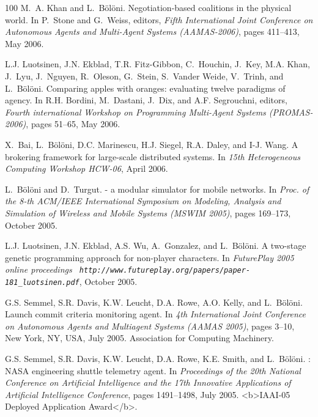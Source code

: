 \begin{thebibliography}{100}
M.~A. Khan and L.~Bölöni.
\newblock Negotiation-based coalitions in the physical world.
\newblock In P.~Stone and G.~Weiss, editors, {\em Fifth International Joint
  Conference on Autonomous Agents and Multi-Agent Systems (AAMAS-2006)}, pages
  411--413, May 2006.

L.J. Luotsinen, J.N. Ekblad, T.R. Fitz-Gibbon, C.~Houchin, J.~Key, M.A. Khan,
  J.~Lyu, J.~Nguyen, R.~Oleson, G.~Stein, S.~Vander Weide, V.~Trinh, and
  L.~Bölöni.
\newblock Comparing apples with oranges: evaluating twelve paradigms of agency.
\newblock In R.H. Bordini, M.~Dastani, J.~Dix, and A.F. Segrouchni, editors,
  {\em Fourth international Workshop on Programming Multi-Agent Systems
  (PROMAS-2006)}, pages 51--65, May 2006.

X.~Bai, L.~Bölöni, D.C. Marinescu, H.J. Siegel, R.A. Daley, and I-J. Wang.
\newblock A brokering framework for large-scale distributed systems.
\newblock In {\em 15th Heterogeneous Computing Workshop HCW-06}, April 2006.

L.~Bölöni and D.~Turgut.
 - a modular simulator for mobile networks.
\newblock In {\em Proc. of the 8-th ACM/IEEE International Symposium on
  Modeling, Analysis and Simulation of Wireless and Mobile Systems (MSWIM
  2005)}, pages 169--173, October 2005.

L.J. Luotsinen, J.N. Ekblad, A.S. Wu, A.~Gonzalez, and L.~Bölöni.
\newblock A two-stage genetic programming approach for non-player characters.
\newblock In {\em FuturePlay 2005 online proceedings {\tt
  http://www.futureplay.org/papers/paper-181\_luotsinen.pdf}}, October 2005.

G.S. Semmel, S.R. Davis, K.W. Leucht, D.A. Rowe, A.O. Kelly, and L.~Bölöni.
\newblock Launch commit criteria monitoring agent.
\newblock In {\em 4th International Joint Conference on Autonomous Agents and
  Multiagent Systems (AAMAS 2005)}, pages 3--10, New York, NY, USA, July 2005.
  Association for Computing Machinery.

G.S. Semmel, S.R. Davis, K.W. Leucht, D.A. Rowe, K.E. Smith, and L.~Bölöni.
: {NASA} engineering shuttle telemetry agent.
\newblock In {\em Proceedings of the 20th National Conference on Artificial
  Intelligence and the 17th Innovative Applications of Artificial Intelligence
  Conference}, pages 1491--1498, July 2005.
\newblock <b>IAAI-05 Deployed Application Award</b>.


\end{thebibliography}

